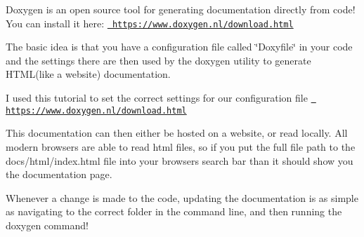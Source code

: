 Doxygen is an open source tool for generating documentation directly from code! You can install it here\+: \href{https://www.doxygen.nl/download.html}{\texttt{ https\+://www.\+doxygen.\+nl/download.\+html}}

The basic idea is that you have a configuration file called \char`\"{}\+Doxyfile\char`\"{} in your code and the settings there are then used by the doxygen utility to generate HTML(like a website) documentation.

I used this tutorial to set the correct settings for our configuration file \href{https://www.doxygen.nl/download.html}{\texttt{ https\+://www.\+doxygen.\+nl/download.\+html}}

This documentation can then either be hosted on a website, or read locally. All modern browsers are able to read html files, so if you put the full file path to the docs/html/index.\+html file into your browsers search bar than it should show you the documentation page.

Whenever a change is made to the code, updating the documentation is as simple as navigating to the correct folder in the command line, and then running the \textquotesingle{}doxygen\textquotesingle{} command! 